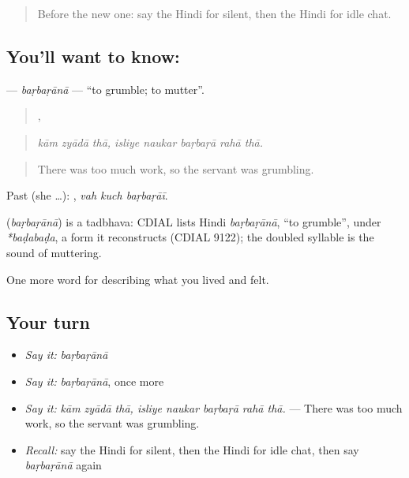 \label{lesson:HI-C473-barbarana}



\begin{quote}
Before the new one: say the Hindi for silent, then the Hindi for idle chat.
\end{quote}

\subsection*{You'll want to know: }
\textbf{} — \emph{baṛbaṛānā} — \textquotedblleft{}to grumble; to mutter\textquotedblright{}.

\begin{quote}
  ,     
\end{quote}

\begin{quote}
\emph{kām zyādā thā, isliye naukar baṛbaṛā rahā thā.}
\end{quote}

\begin{quote}
There was too much work, so the servant was grumbling.
\end{quote}

Past (she …):   , \emph{vah kuch baṛbaṛāī}.

\begin{cousinweb}
\textbf{} (\emph{baṛbaṛānā}) is a tadbhava: CDIAL lists Hindi \emph{baṛbaṛānā}, \textquotedblleft{}to grumble\textquotedblright{}, under \emph{*baḍabaḍa}, a form it reconstructs (CDIAL 9122); the doubled syllable is the sound of muttering.
\end{cousinweb}

\begin{grammarlens}[title={What you've built}]
One more word for describing what you lived and felt.
\end{grammarlens}

\subsection*{Your turn}
\begin{itemize}
\raggedright
  \item \emph{Say it:} \emph{baṛbaṛānā}
  \item \emph{Say it:} \emph{baṛbaṛānā}, once more
  \item \emph{Say it:} \emph{kām zyādā thā, isliye naukar baṛbaṛā rahā thā.} — There was too much work, so the servant was grumbling.
  \item \emph{Recall:} say the Hindi for silent, then the Hindi for idle chat, then say \emph{baṛbaṛānā} again
\end{itemize}

